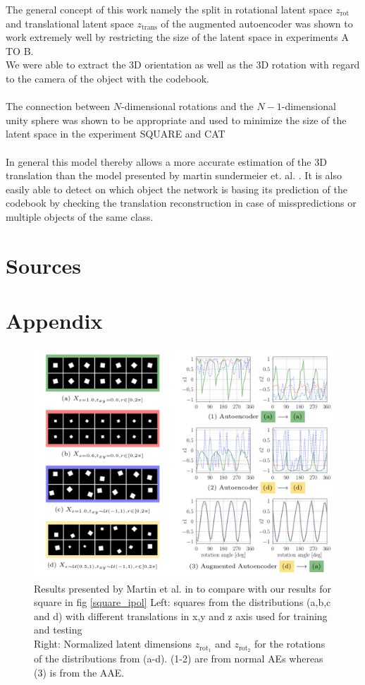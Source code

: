 \documentclass[10pt,a4paper]{article}
\newcommand{\rot}{\ensuremath{\text{rot}\xspace}}
\newcommand{\trans}{\ensuremath{\text{trans}\xspace}}
\begin{document}
The general concept of this work namely the split in rotational latent space $z_{\rot}$ and translational latent space $z_{\trans}$ of the augmented autoencoder was shown to work  extremely well by restricting the size of the latent space in experiments A TO B.\\
We were able to extract the 3D orientation as well as the 3D rotation with regard to the camera of the object with the codebook.\\
\\
The connection between $N$-dimensional rotations and the $N-1$-dimensional unity sphere was shown to be appropriate and used to minimize the size of the latent space in the experiment SQUARE and CAT\\
\\
In general this model thereby allows a more accurate estimation of the 3D translation than the model presented by martin sundermeier et. al. .
It is also easily able to detect on which object the network is basing its prediction of the codebook by checking the translation reconstruction in case of misspredictions or multiple objects of the same class.\\

 
\newpage
\section{Sources}\label{Sources}
\printbibliography

\newpage
\section{Appendix}
\begin{figure}
\center
\includegraphics[width = \linewidth]{MARTIN_Squares.png}
\caption{Results presented by Martin et al. in \cite{3D_Orientation_Learning} to compare with our results for square in fig \ref{square_ipol}
Left: squares from the distributions (a,b,c and d) with different translations in x,y and z axis used for training and testing\\
Right: Normalized latent dimensions $z_{\rot_1}$ and $z_{\rot_2}$ for the rotations of the distributions from (a-d). (1-2) are from normal AEs whereas (3) is from the AAE.}\label{SQUARE_Martin}
\end{figure}
\end{document}
